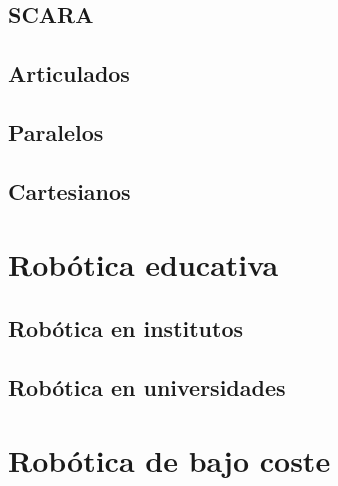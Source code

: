 \subsection{SCARA}
\subsection{Articulados}
\subsection{Paralelos}
\subsection{Cartesianos}

\section{Robótica educativa}
\label{sec:rob_educativa}
\subsection{Robótica en institutos}
\subsection{Robótica en universidades}

\section{Robótica de bajo coste}
\label{sec:rob_bajo:coste}

